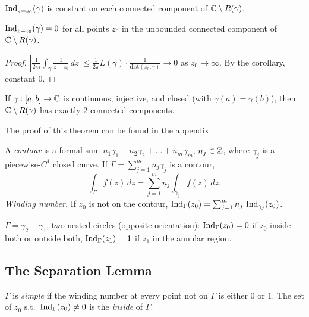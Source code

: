 \documentclass[11pt]{article}
\begin{document}
\begin{corollary}
$\operatorname{Ind}_{z=z_0}(\gamma)$ is constant on each connected component of ${\mathbb{C}}\setminus R(\gamma)$.
\end{corollary}

\begin{proposition}
$\operatorname{Ind}_{z=z_0}(\gamma)=0$ for all points $z_0$ in the unbounded connected component of ${\mathbb{C}}\setminus R(\gamma)$.
\end{proposition}
\begin{proof}
$\left|\frac{1}{2\pi i}\int_\gamma \frac{1}{z-z_0}\,dz\right| \le \frac{1}{2\pi}L(\gamma)\cdot \frac{1}{\mathrm{dist}(z_0,\gamma)} \to 0$ as $z_0\to\infty$. By the corollary, constant $0$.
\end{proof}

\begin{theorem}
If $\gamma:[a,b]\to{\mathbb{C}}$ is continuous, injective, and closed (with $\gamma(a)=\gamma(b)$), then ${\mathbb{C}}\setminus R(\gamma)$ has exactly $2$ connected components.
\end{theorem}

The proof of this theorem can be found in the appendix.

\begin{definition}[Contour]
A \emph{contour} is a formal sum $n_1\gamma_1 + n_2\gamma_2 + \dots + n_m\gamma_m$, $n_j\in{\mathbb{Z}}$, where $\gamma_j$ is a piecewise-$C^1$ closed curve. If $\Gamma = \sum_{j=1}^m n_j\gamma_j$ is a contour,
\[
\int_\Gamma f(z)\,dz = \sum_{j=1}^m n_j\int_{\gamma_j} f(z)\,dz.
\]
\emph{Winding number.} If $z_0$ is not on the contour, $\operatorname{Ind}_\Gamma(z_0) = \sum_{j=1}^m n_j\,\operatorname{Ind}_{\gamma_j}(z_0)$.
\end{definition}

\begin{example}
$\Gamma = \gamma_2-\gamma_1$, two nested circles (opposite orientation): $\operatorname{Ind}_\Gamma(z_0)=0$ if $z_0$ inside both or outside both, $\operatorname{Ind}_\Gamma(z_1)=1$ if $z_1$ in the annular region.
\end{example}

\subsection{The Separation Lemma}

\begin{definition}
$\Gamma$ is \emph{simple} if the winding number at every point not on $\Gamma$ is either $0$ or $1$. The set of $z_0$ s.t.\ $\operatorname{Ind}_\Gamma(z_0)\ne0$ is the \emph{inside} of $\Gamma$.
\end{definition}
\end{document}
